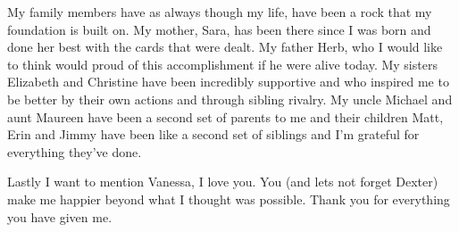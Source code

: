 My family members have as always though my life, have been a rock that my foundation is built on. My mother, Sara, has been there since I was born and done her best with the cards that were dealt. My father Herb, who I would like to think would proud of this accomplishment if he were alive today. My sisters Elizabeth and Christine have been incredibly supportive and who inspired me to be better by their own actions and through sibling rivalry. My uncle Michael and aunt Maureen have been a second set of parents to me and their children Matt, Erin and Jimmy have been like a second set of siblings and I'm grateful for everything they've done.

Lastly I want to mention Vanessa, I love you. You (and lets not forget Dexter) make me happier beyond what I thought was possible. Thank you for everything you have given me.



\vskip 1in

\noindent

